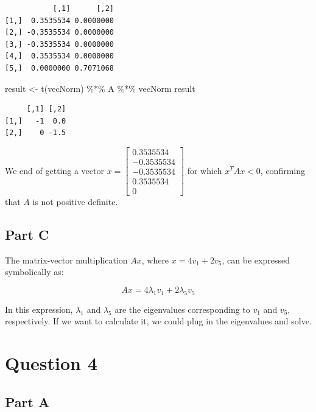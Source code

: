\documentclass[
  letterpaper,
  DIV=11,
  numbers=noendperiod]{scrartcl}
\newenvironment{Shaded}{}{}
\newcommand{\FunctionTok}[1]{\textcolor[rgb]{0.41,0.62,0.42}{#1}}
\newcommand{\NormalTok}[1]{\textcolor[rgb]{0.24,0.22,0.21}{#1}}
\newcommand{\OtherTok}[1]{\textcolor[rgb]{0.41,0.62,0.42}{#1}}
\newcommand{\SpecialCharTok}[1]{\textcolor[rgb]{0.69,0.38,0.53}{#1}}
\begin{document}
\begin{verbatim}
           [,1]      [,2]
[1,]  0.3535534 0.0000000
[2,] -0.3535534 0.0000000
[3,] -0.3535534 0.0000000
[4,]  0.3535534 0.0000000
[5,]  0.0000000 0.7071068
\end{verbatim}

\begin{Shaded}
\begin{Highlighting}[]
\NormalTok{result }\OtherTok{\textless{}{-}} \FunctionTok{t}\NormalTok{(vecNorm) }\SpecialCharTok{\%*\%}\NormalTok{ A }\SpecialCharTok{\%*\%}\NormalTok{ vecNorm}
\NormalTok{result}
\end{Highlighting}
\end{Shaded}

\begin{verbatim}
     [,1] [,2]
[1,]   -1  0.0
[2,]    0 -1.5
\end{verbatim}

We end of getting a vector
\(x = \begin{bmatrix} 0.3535534 \\ -0.3535534 \\ -0.3535534 \\ 0.3535534 \\ 0 \end{bmatrix}\)
for which \(x^T A x < 0\), confirming that \(A\) is not positive
definite.

\newpage{}

\hypertarget{part-c-2}{%
\subsection{Part C}\label{part-c-2}}

The matrix-vector multiplication \(Ax\), where \(x = 4v_1 + 2v_5\), can
be expressed symbolically as:

\[Ax = 4\lambda_1 v_1 + 2\lambda_5 v_5\]

In this expression, \(\lambda_1\) and \(\lambda_5\) are the eigenvalues
corresponding to \(v_1\) and \(v_5\), respectively. If we want to
calculate it, we could plug in the eigenvalues and solve.

\newpage{}

\hypertarget{question-4}{%
\section{Question 4}\label{question-4}}

\hypertarget{part-a-3}{%
\subsection{Part A}\label{part-a-3}}
\end{document}

